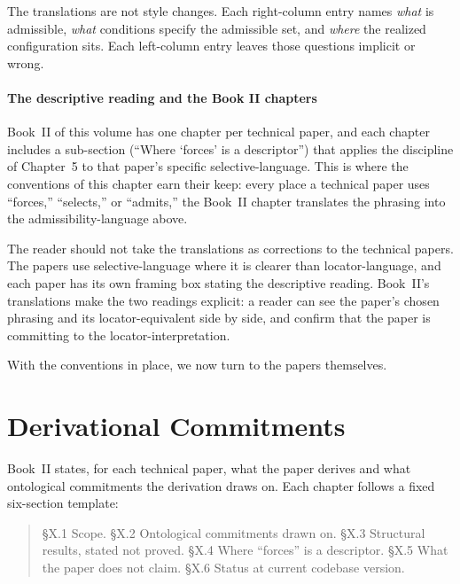\documentclass[11pt]{article}
\begin{document}
\noindent The translations are not style changes. Each right-column entry names \emph{what} is admissible, \emph{what} conditions specify the admissible set, and \emph{where} the realized configuration sits. Each left-column entry leaves those questions implicit or wrong.

\subsection{The descriptive reading and the Book II chapters}\label{sec:descriptive_bookII}

Book~II of this volume has one chapter per technical paper, and each chapter includes a sub-section (``Where `forces' is a descriptor'') that applies the discipline of Chapter~5 to that paper's specific selective-language. This is where the conventions of this chapter earn their keep: every place a technical paper uses ``forces,'' ``selects,'' or ``admits,'' the Book~II chapter translates the phrasing into the admissibility-language above.

The reader should not take the translations as corrections to the technical papers. The papers use selective-language where it is clearer than locator-language, and each paper has its own framing box stating the descriptive reading. Book~II's translations make the two readings explicit: a reader can see the paper's chosen phrasing and its locator-equivalent side by side, and confirm that the paper is committing to the locator-interpretation.

With the conventions in place, we now turn to the papers themselves.

\clearpage

\part{Derivational Commitments}

\noindent Book~II states, for each technical paper, what the paper derives and what ontological commitments the derivation draws on. Each chapter follows a fixed six-section template:

\begin{quote}
\S X.1 Scope. \hspace{2em} \S X.2 Ontological commitments drawn on. \hspace{2em} \S X.3 Structural results, stated not proved. \hspace{2em} \S X.4 Where ``forces'' is a descriptor. \hspace{2em} \S X.5 What the paper does not claim. \hspace{2em} \S X.6 Status at current codebase version.
\end{quote}
\end{document}
